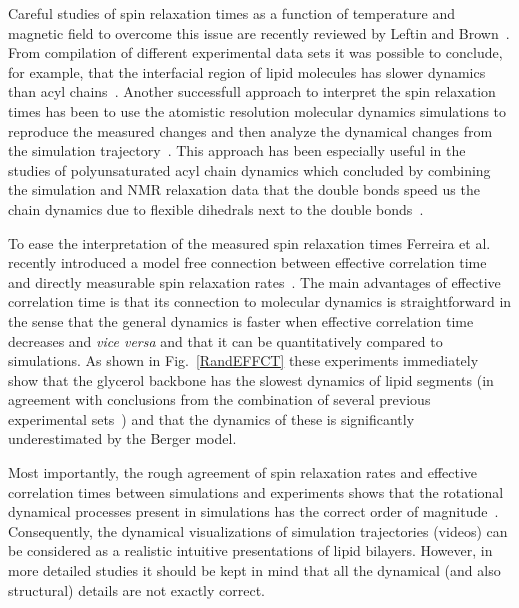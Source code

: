 \documentclass[aps,prl,superscriptaddress,twocolumn]{revtex4}
\begin{document}
Careful studies of spin relaxation times as a function of temperature and magnetic field to overcome this issue are 
recently reviewed by Leftin and Brown~\cite{leftin11}. From compilation of different experimental data sets it was possible 
to conclude, for example, that the interfacial region of lipid molecules has slower dynamics than acyl chains~\cite{leftin11}.
Another successfull approach to interpret the spin relaxation times has been to use the atomistic resolution molecular dynamics
simulations to reproduce the measured changes and then analyze the dynamical changes from the simulation trajectory~\cite{feller02,eldho03,nowacka13}.
This approach has been especially useful in the studies of polyunsaturated acyl chain dynamics which concluded
by combining the simulation and NMR relaxation data that the double bonds speed us the chain dynamics
due to flexible dihedrals next to the double bonds~\cite{feller02,eldho03,gawrisch03,stillwell03}.

To ease the interpretation of the measured spin relaxation times Ferreira et al. recently introduced a model
free connection between effective correlation time and directly measurable spin relaxation rates~\cite{ferreira15}.
The main advantages of effective correlation time is that its connection to molecular dynamics is straightforward in
the sense that the general dynamics is faster when effective correlation time decreases and {\it vice versa} and
that it can be quantitatively compared to simulations. As shown in Fig.~\ref{RandEFFCT} these experiments
immediately show that the glycerol backbone has the slowest dynamics of lipid segments (in agreement with conclusions from the
combination of several previous experimental sets~\cite{leftin11}) and that the dynamics
of these is significantly underestimated by the Berger model.

Most importantly, the rough agreement of spin relaxation rates and effective correlation times between 
simulations and experiments shows that the rotational dynamical processes present in simulations has the 
correct order of magnitude~\cite{pastor88,lindahl01,pastor02,klauda08a,klauda08b,wohlert06,feller02,eldho03,ollila07a,klauda08b,klauda12,ferreira15}. 
Consequently, the dynamical visualizations of simulation trajectories 
(videos) can be considered as a realistic intuitive presentations of lipid bilayers. However,
in more detailed studies it should be kept in mind that all the dynamical (and also structural) details
are not exactly correct. 
\end{document}
